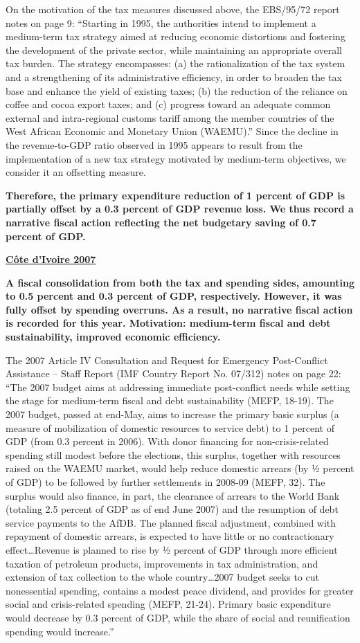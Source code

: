 On the motivation of the tax measures discussed above, the EBS/95/72 report notes on page 9: “Starting in 1995, the authorities intend to implement a medium-term tax strategy aimed at reducing economic distortions and fostering the development of the private sector, while maintaining an appropriate overall tax burden. The strategy encompasses: (a) the rationalization of the tax system and a strengthening of its administrative efficiency, in order to broaden the tax base and enhance the yield of existing taxes; (b) the reduction of the reliance on coffee and cocoa export taxes; and (c) progress toward an adequate common external and intra-regional customs tariff among the member countries of the West African Economic and Monetary Union (WAEMU).” Since the decline in the revenue-to-GDP ratio observed in 1995 appears to result from the implementation of a new tax strategy motivated by medium-term objectives, we consider it an offsetting measure.

\textbf{Therefore, the primary expenditure reduction of 1 percent of GDP is partially offset by a 0.3 percent of GDP revenue loss. We thus record a narrative fiscal action reflecting the net budgetary saving of 0.7 percent of GDP.}

\textbf{\underline{Côte d'Ivoire 2007}}

\textbf{A fiscal consolidation from both the tax and spending sides, amounting to 0.5 percent and 0.3 percent of GDP, respectively. However, it was fully offset by spending overruns. As a result, no narrative fiscal action is recorded for this year. Motivation: medium-term fiscal and debt sustainability, improved economic efficiency.}

The 2007 Article IV Consultation and Request for Emergency Post-Conflict Assistance – Staff Report (IMF Country Report No. 07/312) notes on page 22: “The 2007 budget aims at addressing immediate post-conflict needs while setting the stage for medium-term fiscal and debt sustainability (MEFP, 18-19). The 2007 budget, passed at end-May, aims to increase the primary basic surplus (a measure of mobilization of domestic resources to service debt) to 1 percent of GDP (from 0.3 percent in 2006). With donor financing for non-crisis-related spending still modest before the elections, this surplus, together with resources raised on the WAEMU market, would help reduce domestic arrears (by ½ percent of GDP) to be followed by further settlements in 2008-09 (MEFP, 32). The surplus would also finance, in part, the clearance of arrears to the World Bank (totaling 2.5 percent of GDP as of end June 2007) and the resumption of debt service payments to the AfDB. The planned fiscal adjustment, combined with repayment of domestic arrears, is expected to have little or no contractionary effect…Revenue is planned to rise by ½ percent of GDP through more efficient taxation of petroleum products, improvements in tax administration, and extension of tax collection to the whole country…2007 budget seeks to cut nonessential spending, contains a modest peace dividend, and provides for greater social and crisis-related spending (MEFP, 21-24). Primary basic expenditure would decrease by 0.3 percent of GDP, while the share of social and reunification spending would increase.”

